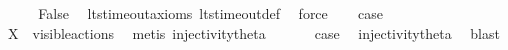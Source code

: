 \begin{isabellebody}
\ {}\isanewline
\ \ \isamarkupfalse%
\ False\ \isamarkupfalse%
\ lts{\isacharunderscore}{\kern0pt}timeout{\isacharunderscore}{\kern0pt}axioms\ lts{\isacharunderscore}{\kern0pt}timeout{\isacharunderscore}{\kern0pt}def\ \isamarkupfalse%
\ force\isanewline
\ \ \isamarkupfalse%
\ {\isacharquery}{\kern0pt}case\ \isacommand{{\isachardot}{\kern0pt}{\isachardot}{\kern0pt}}\isamarkupfalse%
\isanewline
{}\isamarkupfalse%
\isanewline
\ \ \isamarkupfalse%
\ {}\isanewline
\ \ \isamarkupfalse%
\ {\isacartoucheopen}X\ {\isasymsubseteq}\ visible{\isacharunderscore}{\kern0pt}actions{\isacartoucheclose}\ \isamarkupfalse%
\ {\isacharparenleft}{\kern0pt}metis\ injectivity{\isacharunderscore}{\kern0pt}theta{\isacharparenleft}{\kern0pt}{}{\isacharparenright}{\kern0pt}{\isacharparenright}{\kern0pt}\isanewline
\ \ \isamarkupfalse%
\ {}\ \isamarkupfalse%
\ {\isacharquery}{\kern0pt}case\ \isamarkupfalse%
\ injectivity{\isacharunderscore}{\kern0pt}theta{\isacharparenleft}{\kern0pt}{}{\isacharparenright}{\kern0pt}\ \isamarkupfalse%
\ blast\isanewline
{}\isamarkupfalse%
%
\endisatagproof
{\isafoldproof}%
%
\isadelimproof
\isanewline
%
\endisadelimproof
\isanewline
{}\isamarkupfalse%
\ %
%
\isadelimtheory
%
\endisadelimtheory
%
\isatagtheory
%
\endisatagtheory
{\isafoldtheory}%
%
\isadelimtheory
%
\endisadelimtheory
%
\end{isabellebody}%
\endinput
